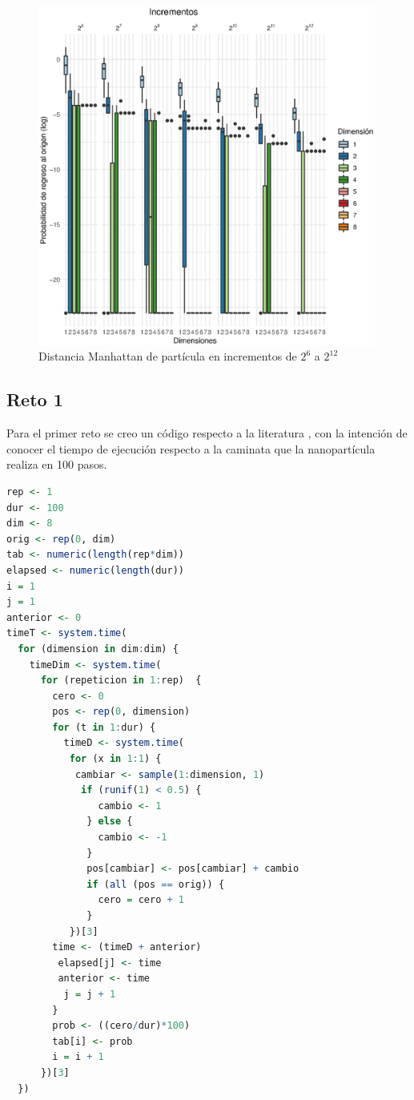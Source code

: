 \documentclass[12pt, letterpaper] {article}
\begin{document}
\begin{figure}[H]
\centering\includegraphics[width=111mm]{d_Manh.eps}
\caption{Distancia Manhattan de partícula en incrementos de $2^6$ a $2^{12}$}
\label{PS}
\end{figure}

\subsection{Reto 1}

Para el primer reto se creo un código respecto a la literatura \cite{P1JA}, con la intención de conocer el tiempo de ejecución respecto a la caminata que la nanopartícula realiza en 100 pasos.

\begin{lstlisting}[language=R]
rep <- 1
dur <- 100
dim <- 8
orig <- rep(0, dim)
tab <- numeric(length(rep*dim))
elapsed <- numeric(length(dur))
i = 1
j = 1
anterior <- 0
timeT <- system.time(
  for (dimension in dim:dim) {
    timeDim <- system.time(
      for (repeticion in 1:rep)  { 
        cero <- 0              
        pos <- rep(0, dimension)
        for (t in 1:dur) {
          timeD <- system.time(
           for (x in 1:1) {
            cambiar <- sample(1:dimension, 1)                     
             if (runif(1) < 0.5) {
                cambio <- 1
              } else {
                cambio <- -1
              }
              pos[cambiar] <- pos[cambiar] + cambio
              if (all (pos == orig)) {
                cero = cero + 1
              }
           })[3]
        time <- (timeD + anterior)
         elapsed[j] <- time
         anterior <- time
          j = j + 1
        }
        prob <- ((cero/dur)*100)
        tab[i] <- prob
        i = i + 1
      })[3]
  })
  \end{lstlisting}
\end{document}
